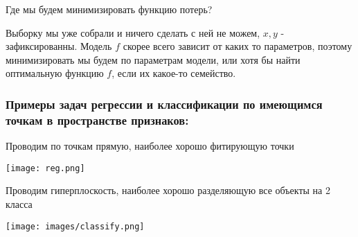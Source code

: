 Где мы будем минимизировать функцию потерь?


Выборку мы уже собрали и ничего сделать с ней не можем, $x, y$ - зафиксированны. Модель $f$ скорее всего зависит от каких то параметров, поэтому минимизировать мы будем по параметрам модели, или хотя бы найти
оптимальную функцию $f$, если их какое-то семейство.

\subsubsection*{Примеры задач регрессии и классификации по имеющимся точкам в пространстве признаков:}

Проводим по точкам прямую, наиболее хорошо фитирующую точки

\begin{center}
    \texttt{[image: reg.png]}
\end{center}


Проводим гиперплоскость, наиболее хорошо разделяющую все объекты на 2 класса

\begin{center}
    \texttt{[image: images/classify.png]}
\end{center}

